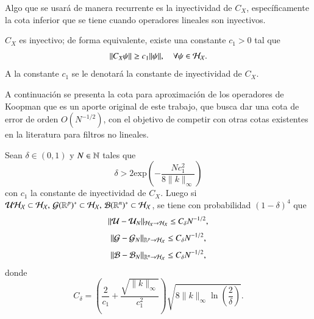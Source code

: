 Algo que se usará de manera recurrente es la inyectividad de $C_X$, específicamente la cota inferior que se tiene cuando operadores lineales son inyectivos.

\begin{lema}
    $C_X$ es inyectivo; de forma equivalente, existe una constante $c_1 > 0$ tal que
    \[
    \| C_X \psi \| \geq c_1 \| \psi \|, \quad \forall \psi \in \mathcal{H}_{\mathcal{X}}.
    \]
    A la constante $c_1$ se le denotará la constante de inyectividad de $C_X$.
\end{lema}


A continuación se presenta la cota para aproximación de los operadores de Koopman que es un aporte original de este trabajo, que busca dar una cota de error de orden $O(N^{-1/2})$, con el objetivo de competir con otras cotas existentes en la literatura para filtros no lineales.

\begin{teo}
\label{teo:error_koop_sqrt_N_def}
Sean $\delta \in (0, 1)$ y $N \in \mathbb{N}$ tales que
\[
\delta > 2 \text{exp} \left ( -\frac{Nc_1^2}{8\|k\|_\infty}\right )
\]
con $c_1$ la constante de inyectividad de $C_X$. Luego si $\mathcal{U} \mathcal{H}_{\mathcal{X}} \subset \mathcal{H}_{\mathcal{X}}, \, \mathcal{G} (\mathbb{R}^p)^* \subset \mathcal{H}_{\mathcal{X}}, \, \mathcal{B} (\mathbb{R}^n)^* \subset \mathcal{H}_{\mathcal{X}}$, se tiene con probabilidad $(1-\delta)^4$ que 
 \begin{equation}
    \| \mathcal{U} - \mathcal{U}_N \|_{\mathcal{H}_{\mathcal{X}} \to \mathcal{H}_{\mathcal{X}}} \leq C_\delta N^{-1/2},
    \label{eq:kEDMD_bound}
\end{equation}
\begin{equation*}
\| \mathcal{G} - \mathcal{G}_N \|_{\mathbb{R}^p \to \mathcal{H}_{\mathcal{X}}} \leq C_\delta N^{-1/2},
\end{equation*}
\begin{equation*}
\| \mathcal{B} - \mathcal{B}_N \|_{\mathbb{R}^n \to \mathcal{H}_{\mathcal{X}}} \leq C_\delta N^{-1/2},
\end{equation*}
donde 
\[
C_\delta = \left ( \frac{2}{c_1} + \frac{\sqrt{\| k \|_{\infty}}}{c_1^2}
  \right )\sqrt{8 \| k \|_\infty \ln \left ( \frac{2}{\delta}\right ) }.
\]
\end{teo}

